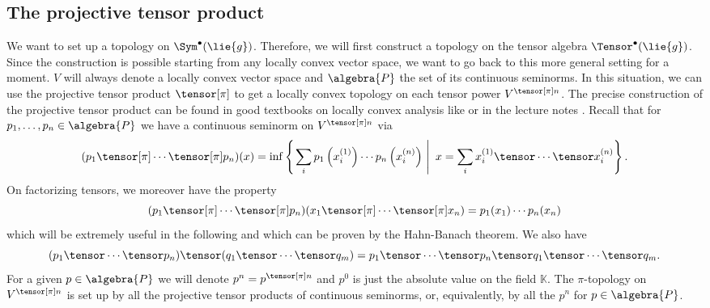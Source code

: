 \subsection{The projective tensor product}

We want to set up a topology on $\Sym^{\bullet}(\lie{g})$. Therefore, 
we will first construct a topology on the tensor algebra $\Tensor^{\bullet}
(\lie{g})$. Since the construction is possible starting from any locally 
convex vector space, we want to go back to this more general setting for a 
moment. $V$ will always denote a locally convex vector space and $\algebra{P}$ 
the set of its continuous seminorms. In this situation, we can use the 
projective tensor product $\tensor[\pi]$ to get a locally convex 
topology on each tensor power $V^{\tensor[\pi] n}$. The precise construction 
of the projective tensor product can be found in good textbooks on locally 
convex analysis like \cite[Chapter 15]{jarchow:1981a} or in the lecture notes 
\cite[Lemma 4.1.4]{waldmann:2014a:script}. 
Recall that for $p_1, \ldots, p_n \in \algebra{P}$ we have a continuous 
seminorm on $V^{\tensor[\pi] n}$ via
\begin{equation*}
	(p_1 \tensor[\pi] \cdots \tensor[\pi] p_n)(x)
	=
	\inf
	\left\{
	\left.
		\sum_i
		p_1 \left( x_i^{(1)} \right)
		\cdots
		p_n \left( x_i^{(n)} \right)
	\ \right| \
		x
		=
		\sum_i
		x_i^{(1)}
		\tensor \cdots \tensor
		x_i^{(n)}
	\right\}.
\end{equation*}
On factorizing tensors, we moreover have the property
\begin{equation}
	\label{LCAna:FactorTensor}
	(p_1 \tensor[\pi] \cdots \tensor[\pi] p_n)
	(x_1 \tensor[\pi] \cdots \tensor[\pi] x_n)
	=
	p_1(x_1) \cdots p_n(x_n)
\end{equation}
which will be extremely useful in the following and which can be proven by
the Hahn-Banach theorem. We also have 
\begin{equation*}
	(p_1 \tensor \cdots \tensor p_n) 
	\tensor 
	(q_1 \tensor \cdots \tensor q_m) 
	= 
	p_1 \tensor \cdots \tensor p_n \tensor q_1 \tensor \cdots \tensor q_m.
\end{equation*}
For a given $p \in \algebra{P}$ we will denote $p^n = p^{\tensor[\pi] n}$ and 
$p^0$ is just the absolute value on the field $\mathbb{K}$. The $\pi$-topology 
on $V^{\tensor[\pi] n}$ is set up by all the projective tensor products of 
continuous seminorms, or, equivalently, by all the $p^n$ for $p \in 
\algebra{P}$.

